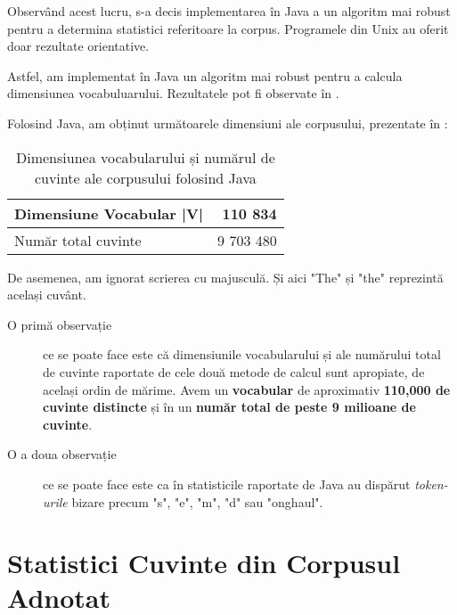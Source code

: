 Observând acest lucru, s-a decis implementarea în Java a un algoritm mai robust pentru a determina statistici referitoare la corpus. Programele din Unix au oferit doar rezultate orientative.

Astfel, am implementat în Java un algoritm mai robust pentru a calcula dimensiunea vocabuluarului. Rezultatele pot fi observate în .

Folosind Java, am obținut următoarele dimensiuni ale corpusului, prezentate în :

\begin{center}
\begin{table}[htb]
  \caption{Dimensiunea vocabularului și numărul de cuvinte ale corpusului folosind Java}
  \begin{tabular}{|l|r|}
    \hline
    Dimensiune Vocabular |V| & 110 834\\
    \hline
    Număr total cuvinte & 9 703 480 \\
     \hline
  \end{tabular}
  \label{table:vocabulary-size-java}
\end{table}
\end{center}

\lstset{language=make}
\lstset{caption=Cele mai folosite cuvinte din limba engleză pentru corpusul obținut folosind Java, label=lst:top-words-java}


De asemenea, am ignorat scrierea cu majusculă. Și aici "The" și "the" reprezintă același cuvânt.

\begin{description}
	\item[O primă observație] ce se poate face este că dimensiunile vocabularului și ale numărului total de cuvinte raportate de cele două metode de calcul sunt apropiate, de același ordin de mărime. Avem un \textbf{vocabular} de aproximativ \textbf{110,000 de cuvinte distincte} și în un\textbf{ număr total de peste 9 milioane de cuvinte}.
	\item [O a doua observație] ce se poate face este ca în statisticile raportate de Java au dispărut \textit{token-urile} bizare precum "s", "e", "m", "d" sau "onghaul".
\end{description}

\section{Statistici Cuvinte din Corpusul Adnotat}

